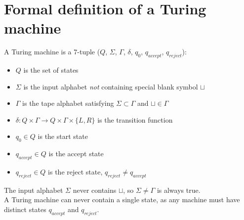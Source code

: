 \documentclass{article}
\begin{document}
\section{Formal definition of a Turing machine}
A Turing machine is a 7-tuple ($Q$, $\Sigma$, $\Gamma$, $\delta$, $q_0$, $q_{accept}$, $q_{reject}$):
\begin{itemize}
	\item $Q$ is the set of states
	\item $\Sigma$ is the input alphabet \textit{not} containing special blank symbol $\sqcup$
	\item $\Gamma$ is the tape alphabet satisfying $\Sigma \subset \Gamma$ and $\sqcup \in \Gamma$
	\item $\delta : Q \times \Gamma \rightarrow Q \times \Gamma \times \{L, R\}$ is the transition function
	\item $q_0 \in Q$ is the start state
	\item $q_{accept} \in Q$ is the accept state
	\item $q_{reject} \in Q$ is the reject state, $q_{reject} \neq q_{accept}$
\end{itemize}
The input alphabet $\Sigma$ never contains $\sqcup$, so $\Sigma \neq \Gamma$ is always true.
\\ A Turing machine can never contain a single state, as any machine must have distinct states $q_{accept}$ and $q_{reject}$.
\end{document}
